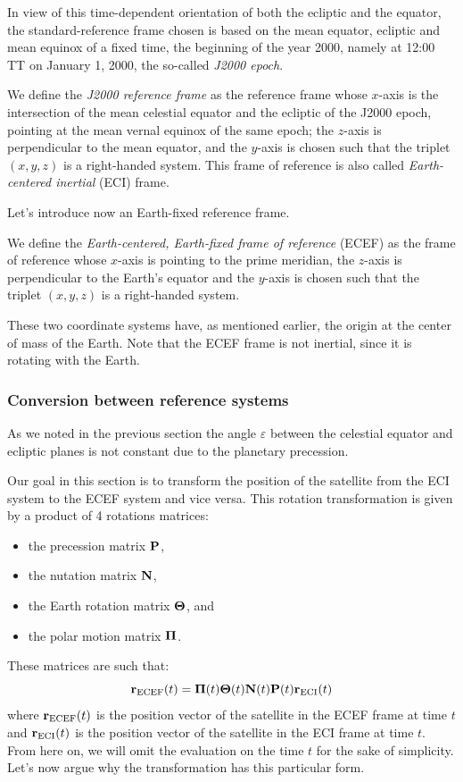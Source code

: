 \documentclass[../main.tex]{subfiles}
\begin{document}
In view of this time-dependent orientation of both the ecliptic and the equator, the standard-reference frame chosen is based on the mean equator, ecliptic and mean equinox of a fixed time, the beginning of the year 2000, namely at 12:00 TT on January 1, 2000, the so-called \emph{J2000 epoch}.
\begin{definition}
  We define the \emph{J2000 reference frame} as the reference frame whose $x$-axis is the intersection of the mean celestial equator and the ecliptic of the J2000 epoch, pointing at the mean vernal equinox of the same epoch; the $z$-axis is perpendicular to the mean equator, and the $y$-axis is chosen such that the triplet $(x,y,z)$ is a right-handed system. This frame of reference is also called \emph{Earth-centered inertial} (ECI) frame.
\end{definition}

Let's introduce now an Earth-fixed reference frame.
\begin{definition}
  We define the \emph{Earth-centered, Earth-fixed frame of reference} (ECEF) as the frame of reference whose $x$-axis is pointing to the prime meridian, the $z$-axis is perpendicular to the Earth's equator and the $y$-axis is chosen such that the triplet $(x,y,z)$ is a right-handed system.
\end{definition}
These two coordinate systems have, as mentioned earlier, the origin at the center of mass of the Earth. Note that the ECEF frame is not inertial, since it is rotating with the Earth.
\subsubsection{Conversion between reference systems}

As we noted in the previous section the angle $\varepsilon$ between the celestial equator and ecliptic planes is not constant due to the planetary precession.

Our goal in this section is to transform the position of the satellite from the ECI system to the ECEF system and vice versa. This rotation transformation is given by a product of 4 rotations matrices:
\begin{itemize}
  \item the precession matrix $\boldsymbol{\mathrm{P}}$,
  \item the nutation matrix $\boldsymbol{\mathrm{N}}$,
  \item the Earth rotation matrix $\boldsymbol{\mathrm{\Theta}}$, and
  \item the polar motion matrix $\boldsymbol{\mathrm{\Pi}}$.
\end{itemize}
These matrices are such that:
\begin{equation}
  \boldsymbol{\mathrm{r}}_\mathrm{ECEF}(t)=\boldsymbol{\mathrm{\Pi}}(t)\boldsymbol{\mathrm{\Theta}}(t)\boldsymbol{\mathrm{N}}(t)\boldsymbol{\mathrm{P}}(t)\boldsymbol{\mathrm{r}}_\mathrm{ECI}(t)
\end{equation}
where $\boldsymbol{\mathrm{r}}_\mathrm{ECEF}(t)$ is the position vector of the satellite in the ECEF frame at time $t$ and $\boldsymbol{\mathrm{r}}_\mathrm{ECI}(t)$ is the position vector of the satellite in the ECI frame at time $t$. From here on, we will omit the evaluation on the time $t$ for the sake of simplicity. Let's now argue why the transformation has this particular form.
\end{document}
